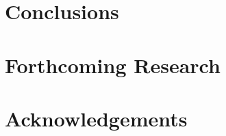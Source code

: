 \documentclass[a0, landscape]{a0poster}
\begin{document}
\begin{multicols}{4}
\section*{Conclusions}

\color{DarkSlateGray} %


\section*{Forthcoming Research}


\nocite{*} %


\section*{Acknowledgements}

\end{multicols}
\end{document}
